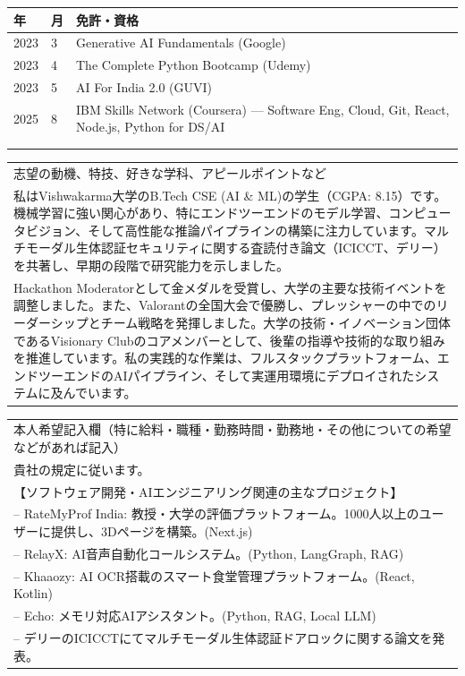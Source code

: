 \documentclass[9pt,a4paper]{article}
\begin{document}
\noindent
\begin{tabularx}{\textwidth}{|p{16mm}|p{10mm}|X|}
\hline
\centering 年 & \centering 月 & \centering 免許・資格 \tabularnewline \hline
2023 & 3  & Generative AI Fundamentals (Google) \\
2023 & 4  & The Complete Python Bootcamp (Udemy) \\
2023 & 5  & AI For India 2.0 (GUVI) \\
2025 & 8  & IBM Skills Network (Coursera) --- Software Eng, Cloud, Git, React, Node.js, Python for DS/AI \\
\rule{0pt}{14pt} & & \\
\rule{0pt}{14pt} & & \\
\hline
\end{tabularx}
\vspace{4mm}

\noindent
\begin{tabularx}{\textwidth}{|X|}
\hline
\rule{0pt}{12pt}志望の動機、特技、好きな学科、アピールポイントなど \\[2mm]
私はVishwakarma大学のB.Tech CSE (AI \& ML)の学生（CGPA: 8.15）です。機械学習に強い関心があり、特にエンドツーエンドのモデル学習、コンピュータビジョン、そして高性能な推論パイプラインの構築に注力しています。マルチモーダル生体認証セキュリティに関する査読付き論文（ICICCT、デリー）を共著し、早期の段階で研究能力を示しました。\\[2mm]
Hackathon Moderatorとして金メダルを受賞し、大学の主要な技術イベントを調整しました。また、Valorantの全国大会で優勝し、プレッシャーの中でのリーダーシップとチーム戦略を発揮しました。大学の技術・イノベーション団体であるVisionary Clubのコアメンバーとして、後輩の指導や技術的な取り組みを推進しています。私の実践的な作業は、フルスタックプラットフォーム、エンドツーエンドのAIパイプライン、そして実運用環境にデプロイされたシステムに及んでいます。
\\[2mm] \hline
\end{tabularx}
\vspace{4mm}

\noindent
\begin{tabularx}{\textwidth}{|X|}
\hline
\rule{0pt}{12pt}本人希望記入欄（特に給料・職種・勤務時間・勤務地・その他についての希望などがあれば記入） \\[2mm]
貴社の規定に従います。\\[2mm]
【ソフトウェア開発・AIエンジニアリング関連の主なプロジェクト】\\
-- RateMyProf India: 教授・大学の評価プラットフォーム。1000人以上のユーザーに提供し、3Dページを構築。(Next.js)\\
-- RelayX: AI音声自動化コールシステム。(Python, LangGraph, RAG)\\
-- Khaaozy: AI OCR搭載のスマート食堂管理プラットフォーム。(React, Kotlin)\\
-- Echo: メモリ対応AIアシスタント。(Python, RAG, Local LLM)\\
-- デリーのICICCTにてマルチモーダル生体認証ドアロックに関する論文を発表。
\\[2mm] \hline
\end{tabularx}
\end{document}
